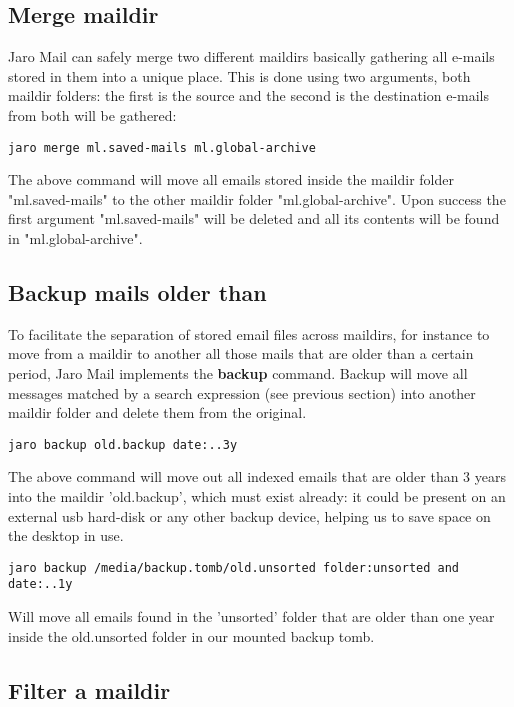 \documentclass[a4,onecolumn,portrait]{article}
\begin{document}
\subsection{Merge maildir}
\label{sec-9-1}

Jaro Mail can safely merge two different maildirs basically gathering
all e-mails stored in them into a unique place. This is done using two
arguments, both maildir folders: the first is the source and the
second is the destination e-mails from both will be gathered:

\begin{verbatim}
jaro merge ml.saved-mails ml.global-archive
\end{verbatim}

The above command will move all emails stored inside the maildir
folder "ml.saved-mails" to the other maildir folder
"ml.global-archive". Upon success the first argument "ml.saved-mails"
will be deleted and all its contents will be found in
"ml.global-archive".
\subsection{Backup mails older than}
\label{sec-9-2}

To facilitate the separation of stored email files across maildirs, for instance to move from a maildir to another all those mails that are older than a certain period, Jaro Mail implements the \textbf{backup} command. Backup will move all messages matched by a search expression (see previous section) into another maildir folder and delete them from the original.

\begin{verbatim}
jaro backup old.backup date:..3y
\end{verbatim}

The above command will move out all indexed emails that are older than
3 years into the maildir 'old.backup', which must exist already: it
could be present on an external usb hard-disk or any other backup
device, helping us to save space on the desktop in use.

\begin{verbatim}
jaro backup /media/backup.tomb/old.unsorted folder:unsorted and date:..1y
\end{verbatim}

Will move all emails found in the 'unsorted' folder that are older than one year inside the old.unsorted folder in our mounted backup tomb.
\subsection{Filter a maildir}
\label{sec-9-3}
\end{document}
